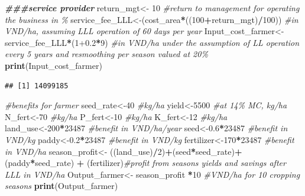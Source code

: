 \documentclass[
]{article}
\newenvironment{Shaded}{\begin{snugshade}}{\end{snugshade}}
\newcommand{\CommentTok}[1]{\textcolor[rgb]{0.56,0.35,0.01}{\textit{#1}}}
\newcommand{\DecValTok}[1]{\textcolor[rgb]{0.00,0.00,0.81}{#1}}
\newcommand{\DocumentationTok}[1]{\textcolor[rgb]{0.56,0.35,0.01}{\textbf{\textit{#1}}}}
\newcommand{\FloatTok}[1]{\textcolor[rgb]{0.00,0.00,0.81}{#1}}
\newcommand{\FunctionTok}[1]{\textcolor[rgb]{0.13,0.29,0.53}{\textbf{#1}}}
\newcommand{\NormalTok}[1]{#1}
\newcommand{\OtherTok}[1]{\textcolor[rgb]{0.56,0.35,0.01}{#1}}
\newcommand{\SpecialCharTok}[1]{\textcolor[rgb]{0.81,0.36,0.00}{\textbf{#1}}}
\begin{document}
\begin{Shaded}
\begin{Highlighting}[]
\DocumentationTok{\#\#\#service provider}
\NormalTok{return\_mgt}\OtherTok{\textless{}{-}} \DecValTok{10} \CommentTok{\#return to management for operating the business in \%}
\NormalTok{service\_fee\_LLL}\OtherTok{\textless{}{-}}\NormalTok{(cost\_area}\SpecialCharTok{*}\NormalTok{((}\DecValTok{100}\SpecialCharTok{+}\NormalTok{return\_mgt)}\SpecialCharTok{/}\DecValTok{100}\NormalTok{))  }\CommentTok{\#in VND/ha, assuming LLL operation of 60 days per year}
\NormalTok{Input\_cost\_farmer}\OtherTok{\textless{}{-}}\NormalTok{service\_fee\_LLL}\SpecialCharTok{*}\NormalTok{(}\DecValTok{1}\FloatTok{+0.2}\SpecialCharTok{*}\DecValTok{9}\NormalTok{) }\CommentTok{\#in VND/ha under the assumption of LL operation every 5 years and resmoothing per season valued at 20\%}
\FunctionTok{print}\NormalTok{(Input\_cost\_farmer)}
\end{Highlighting}
\end{Shaded}

\begin{verbatim}
## [1] 14099185
\end{verbatim}

\begin{Shaded}
\begin{Highlighting}[]
\CommentTok{\#benefits for farmer}
\NormalTok{seed\_rate}\OtherTok{\textless{}{-}}\DecValTok{40} \CommentTok{\#kg/ha}
\NormalTok{yield}\OtherTok{\textless{}{-}}\DecValTok{5500} \CommentTok{\#at 14\% MC, kg/ha}
\NormalTok{N\_fert}\OtherTok{\textless{}{-}}\DecValTok{70} \CommentTok{\#kg/ha}
\NormalTok{P\_fert}\OtherTok{\textless{}{-}}\DecValTok{10} \CommentTok{\#kg/ha}
\NormalTok{K\_fert}\OtherTok{\textless{}{-}}\DecValTok{12} \CommentTok{\#kg/ha}
\NormalTok{land\_use}\OtherTok{\textless{}{-}}\DecValTok{200}\SpecialCharTok{*}\DecValTok{23487} \CommentTok{\#benefit in VND/ha/year}
\NormalTok{seed}\OtherTok{\textless{}{-}}\FloatTok{0.6}\SpecialCharTok{*}\DecValTok{23487} \CommentTok{\#benefit in VND/kg}
\NormalTok{paddy}\OtherTok{\textless{}{-}}\FloatTok{0.2}\SpecialCharTok{*}\DecValTok{23487} \CommentTok{\#benefit in VND/kg}
\NormalTok{fertilizer}\OtherTok{\textless{}{-}}\DecValTok{170}\SpecialCharTok{*}\DecValTok{23487} \CommentTok{\#benefit in VND/ha}
\NormalTok{season\_profit}\OtherTok{\textless{}{-}}\NormalTok{ ((land\_use)}\SpecialCharTok{/}\DecValTok{2}\NormalTok{)}\SpecialCharTok{+}\NormalTok{(seed}\SpecialCharTok{*}\NormalTok{seed\_rate)}\SpecialCharTok{+}\NormalTok{ (paddy}\SpecialCharTok{*}\NormalTok{seed\_rate) }\SpecialCharTok{+}\NormalTok{ (fertilizer)}\CommentTok{\#profit from season\textquotesingle{}s yields and savings after LLL in VND/ha}
\NormalTok{Output\_farmer}\OtherTok{\textless{}{-}}\NormalTok{ season\_profit }\SpecialCharTok{*}\DecValTok{10} \CommentTok{\#VND/ha for 10 cropping seasons}
\FunctionTok{print}\NormalTok{(Output\_farmer)}
\end{Highlighting}
\end{Shaded}
\end{document}
